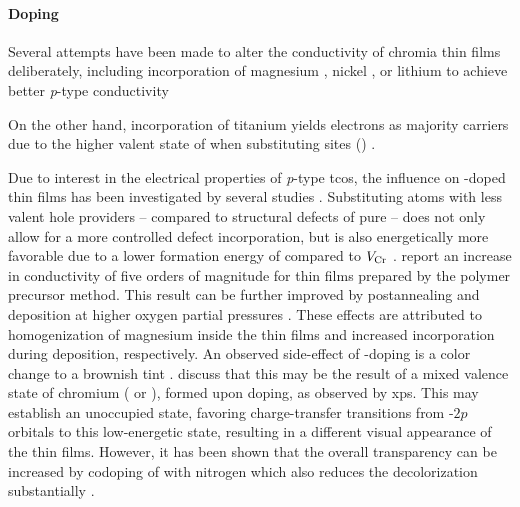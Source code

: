 \paragraph{Doping}
Several attempts have been made to alter the conductivity of chromia thin films deliberately, including incorporation of magnesium
    \cite{uekawa1996,arca2011,farrell2015},
nickel
    \cite{arca2017},
or lithium
    \cite{hagel1965,crosbie1984}
to achieve better \textit{p}-type conductivity
    
On the other hand, incorporation of titanium yields electrons as majority carriers 
    \cite{holt1994}
due to the higher valent state of  when substituting  sites ()
    \cite{kofstad1980}.

Due to interest in the electrical properties of \textit{p}-type \glspl{tco}, the influence on -doped  thin films has been investigated by several studies
    \cite{holt1994,uekawa1996,arca2011,arca2013,farrell2015,arca2017,kehoe2016}.
Substituting  atoms with less valent hole providers -- compared to structural defects of pure  -- does not only allow for a more controlled defect incorporation, but is also energetically more favorable due to a lower formation energy of  compared to $V_{\ce{Cr}}$
    \cite{kehoe2016}.
\textcite{uekawa1996} report an increase in conductivity of five orders of magnitude for  thin films prepared by the polymer precursor method.
This result can be further improved by postannealing
    \cite{farrell2015}
and deposition at higher oxygen partial pressures
    \cite{holt1994,farrell2015}.
These effects are attributed to homogenization of magnesium inside the thin films and increased  incorporation during deposition, respectively.
An observed side-effect of -doping is a color change to a brownish tint
    \cite{uekawa1996,arca2013}.
\textcite{uekawa1996} discuss that this may be the result of a mixed valence state of chromium ( or ), formed upon doping, as observed by \gls{xps}.
This may establish an unoccupied state, favoring charge-transfer transitions from -$2p$ orbitals to this low-energetic state, resulting in a different visual appearance of the thin films.
However, it has been shown that the overall transparency can be increased by codoping of  with nitrogen which also reduces the decolorization substantially
    \cite{arca2011,arca2013}.